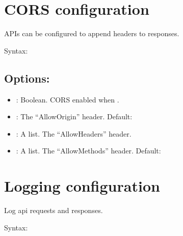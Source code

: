 \documentclass[letterpaper,10pt,english]{sphinxmanual}
\begin{document}
\section{CORS configuration}
\label{\detokenize{api-configuration:cors-configuration}}
APIs can be configured to append  headers to responses.

Syntax:

\begin{sphinxVerbatim}[commandchars=\\\{\}]
    
\end{sphinxVerbatim}


\subsection{Options:}
\label{\detokenize{api-configuration:options}}\begin{itemize}
\item {} 
: Boolean. CORS enabled when .

\item {} 
: The “AllowOrigin” header. Default: 

\item {} 
: A list. The “AllowHeaders” header.

\item {} 
: A list. The “AllowMethods” header. Default: 

\end{itemize}


\section{Logging configuration}
\label{\detokenize{api-configuration:logging-configuration}}
Log api requests and responses.

Syntax:

\begin{sphinxVerbatim}[commandchars=\\\{\}]
   
\end{sphinxVerbatim}
\end{document}

